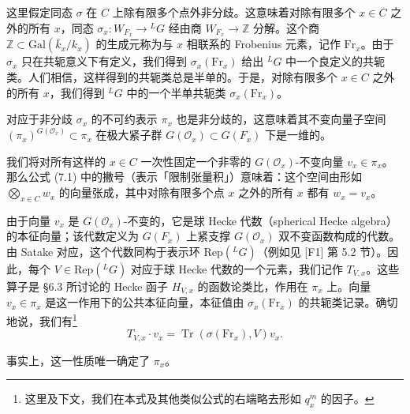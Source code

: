 \documentclass[11pt,a4paper]{article}
\newcommand{\Tr}{\operatorname{Tr}}
\begin{document}
这里假定同态 $\sigma$ 在 $C$ 上除有限多个点外非分歧。这意味着对除有限多个 $x\in C$ 之外的所有 $x$，同态 $\sigma_x: W_{F_x}\to{}^{L}G$ 经由商 $W_{F_x}\to\mathbb{Z}$ 分解。这个商 $\mathbb{Z}\subset\mathrm{Gal}(\bar k_x/k_x)$ 的生成元称为与 $x$ 相联系的 Frobenius 元素，记作 $\mathrm{Fr}_x$。由于 $\sigma_x$ 只在共轭意义下有定义，我们得到 $\sigma_x(\mathrm{Fr}_x)$ 给出 ${}^{L}G$ 中一个良定义的共轭类。人们相信，这样得到的共轭类总是半单的。于是，对除有限多个 $x\in C$ 之外的所有 $x$，我们得到 ${}^{L}G$ 中的一个半单共轭类 $\sigma_x(\mathrm{Fr}_x)$。

对应于非分歧 $\sigma_x$ 的不可约表示 $\pi_x$ 也是非分歧的，这意味着其不变向量子空间 $(\pi_x)^{G(\mathcal{O}_x)}\subset\pi_x$ 在极大紧子群 $G(\mathcal{O}_x)\subset G(F_x)$ 下是一维的。


我们将对所有这样的 $x\in C$ 一次性固定一个非零的 $G(\mathcal{O}_x)$-不变向量 $v_x\in\pi_x$。那么公式 (7.1) 中的撇号（表示「限制张量积」）意味着：这个空间由形如 $\bigotimes_{x\in C}w_x$ 的向量张成，其中对除有限多个点 $x$ 之外的所有 $x$ 都有 $w_x=v_x$。

由于向量 $v_x$ 是 $G(\mathcal{O}_x)$-不变的，它是球 Hecke 代数（spherical Hecke algebra）的本征向量；该代数定义为 $G(F_x)$ 上紧支撑 $G(\mathcal{O}_x)$ 双不变函数构成的代数。由 Satake 对应，这个代数同构于表示环 $\mathrm{Rep}({}^{L}G)$（例如见 [F1] 第 5.2 节）。因此，每个 $V\in\mathrm{Rep}({}^{L}G)$ 对应于球 Hecke 代数的一个元素，我们记作 $T_{V,x}$。这些算子是 §6.3 所讨论的 Hecke 函子 $H_{V,x}$ 的函数论类比，作用在 $\pi_x$ 上。向量 $v_x\in\pi_x$ 是这一作用下的公共本征向量，本征值由 $\sigma_x(\mathrm{Fr}_x)$ 的共轭类记录。确切地说，我们有\footnote{这里及下文，我们在本式及其他类似公式的右端略去形如 $q_x^m$ 的因子。}
\begin{equation}\tag{7.2}
T_{V,x}\cdot v_x = \Tr(\sigma(\mathrm{Fr}_x),V)v_x.
\end{equation}

事实上，这一性质唯一确定了 $\pi_x$。
\end{document}
